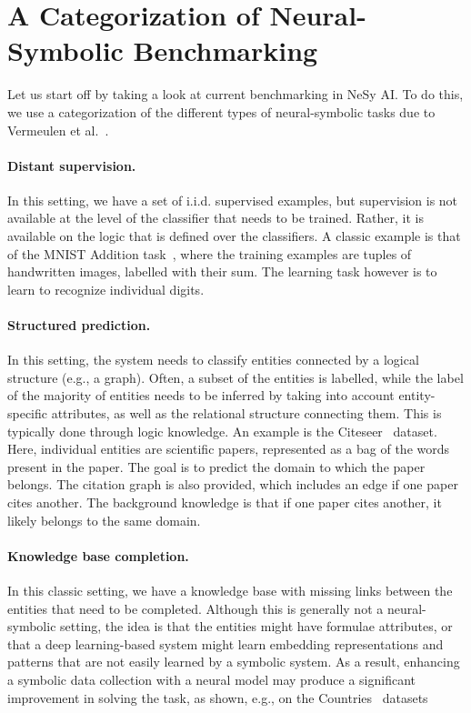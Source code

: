 \section{A Categorization of Neural-Symbolic Benchmarking}\label{tailor:sec:sota}

Let us start off by taking a look at current benchmarking in  NeSy AI. 
To do this, we use a categorization of the different types of neural-symbolic tasks %
due to Vermeulen et al.~\cite{vermeulen2023experimental}.
\paragraph{Distant supervision. }
In this setting, we have a set of i.i.d. supervised examples, but supervision is not available at the level of the classifier that needs to be trained. Rather, it is available on the logic that is defined over the classifiers. A classic example is that of the MNIST Addition task~\cite{manhaeve2018deepproblog}, where the training examples are tuples of handwritten images, labelled with their sum. The learning task however is to learn to recognize individual digits.

\paragraph{Structured prediction.}
In this setting, the system needs to classify entities connected by a logical structure (e.g., a graph). Often, a subset of the entities is labelled, while the label of the majority of entities needs to be inferred by taking into account entity-specific attributes, as well as the relational structure connecting them. This is typically done through logic knowledge. An example 
is the Citeseer~\cite{giles1998citeseer} dataset. Here, individual entities are scientific papers, represented as a bag of the words present in the paper. The goal is to predict the domain to which the paper belongs. The citation graph is also provided, which includes an edge if one paper cites another. The background knowledge is that if one paper cites another, it likely belongs to the same domain.

\paragraph{Knowledge base completion.}
In this classic setting, we have a knowledge base with missing links between the entities that need to be completed. Although this is generally not a neural-symbolic setting, the idea is that the entities might have formulae attributes, or that a deep learning-based system might learn embedding representations and patterns that are not easily learned by a symbolic system. As a result, enhancing a symbolic data collection with a neural model may produce a significant improvement in solving the task, as shown, e.g., on the Countries~\cite{marra2021relational,maene2024soft} datasets

